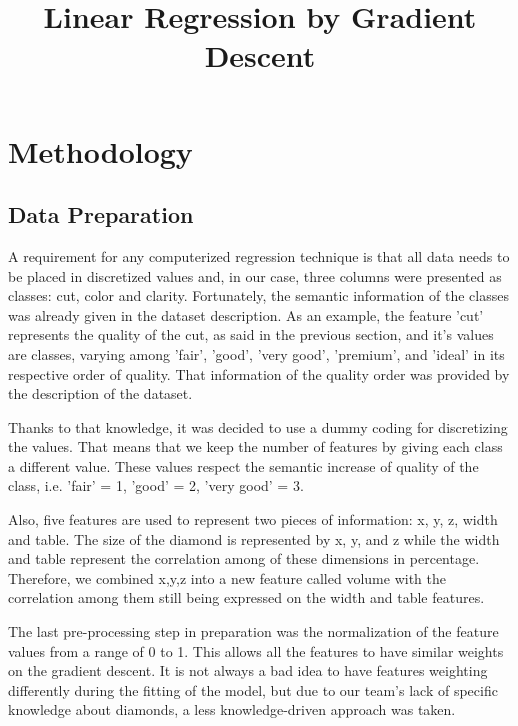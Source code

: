 \documentclass[conference]{IEEEtran}
\begin{document}
\title{Linear Regression by Gradient Descent}

\author{
\and
{}
}

\maketitle

\section{Methodology}

\subsection{Data Preparation}	
    A requirement for any computerized regression technique is that all data needs to be placed in discretized values and, in our case, three columns were presented as classes: cut, color and clarity. Fortunately, the semantic information of the classes was already given in the dataset description. As an example, the feature 'cut' represents the quality of the cut, as said in the previous section, and it's values are classes, varying among 'fair', 'good', 'very good', 'premium', and 'ideal' in its respective order of quality. That information of the quality order was provided by the description of the dataset.
    
    Thanks to that knowledge, it was decided to use a dummy coding for discretizing the values. That means that we keep the number of features by giving each class a different value. These values respect the semantic increase of quality of the class, i.e. 'fair' = 1, 'good' = 2, 'very good' = 3.
    
    Also, five features are used to represent two pieces of information: x, y, z, width and table. The size of the diamond is represented by x, y, and z while the width and table represent the correlation among of these dimensions in percentage. Therefore, we combined x,y,z into a new feature called volume with the correlation among them still being expressed on the width and table features.
    
    The last pre-processing step in preparation was the normalization of the feature values from a range of 0 to 1. This allows all the features to have similar weights on the gradient descent. It is not always a bad idea to have features weighting differently during the fitting of the model, but due to our team's lack of specific knowledge about diamonds, a less knowledge-driven approach was taken.
    
\end{document}
